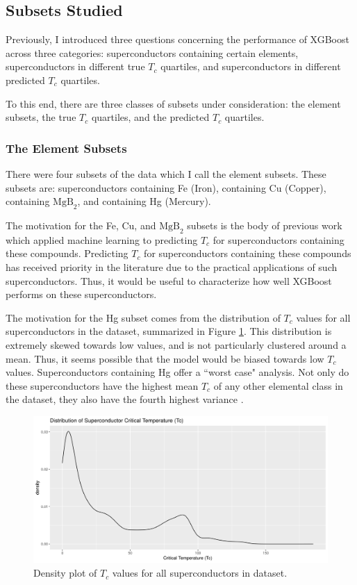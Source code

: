 \documentclass[oneside,12pt]{amsart}
\begin{document}
 \subsection{Subsets Studied}
 Previously, I introduced three questions concerning the performance of XGBoost across three categories: superconductors containing certain elements, superconductors in different true $T_c$ quartiles, and superconductors in different predicted $T_c$ quartiles. 
 
 To this end, there are three classes of subsets under consideration: the element subsets, the true $T_c$ quartiles, and the predicted $T_c$ quartiles.
 
 \subsubsection{The Element Subsets}
 There were four subsets of the data which I call the element subsets. These subsets are: superconductors containing Fe (Iron), containing Cu (Copper), containing $\text{MgB}_2$, and containing Hg (Mercury).
 
 The motivation for the Fe, Cu, and $\text{MgB}_2$ subsets is the body of previous work which applied machine learning to predicting $T_c$ for superconductors containing these compounds. Predicting $T_c$ for superconductors containing these compounds has received priority in the literature due to the practical applications of such superconductors. Thus, it would be useful to characterize how well XGBoost performs on these superconductors.
 
 The motivation for the Hg subset comes from the distribution of $T_c$ values for all superconductors in the dataset, summarized in Figure \ref{fig:Tc_density}. This distribution is extremely skewed towards low values, and is not particularly clustered around a mean. Thus, it seems possible that the model would be biased towards low $T_c$ values. Superconductors containing Hg offer a ``worst case" analysis. Not only do these superconductors have the highest mean $T_c$ of any other elemental class in the dataset, they also have the fourth highest variance \cite{hamidieh_data-driven_2018}. 
 
 \begin{figure}[ht]
     \centering
     \includegraphics[width=0.8\linewidth]{../Plots/Tc_dist.png}
     \caption{Density plot of $T_c$ values for all superconductors in dataset.}
     \label{fig:Tc_density}
 \end{figure}
 
\end{document}
